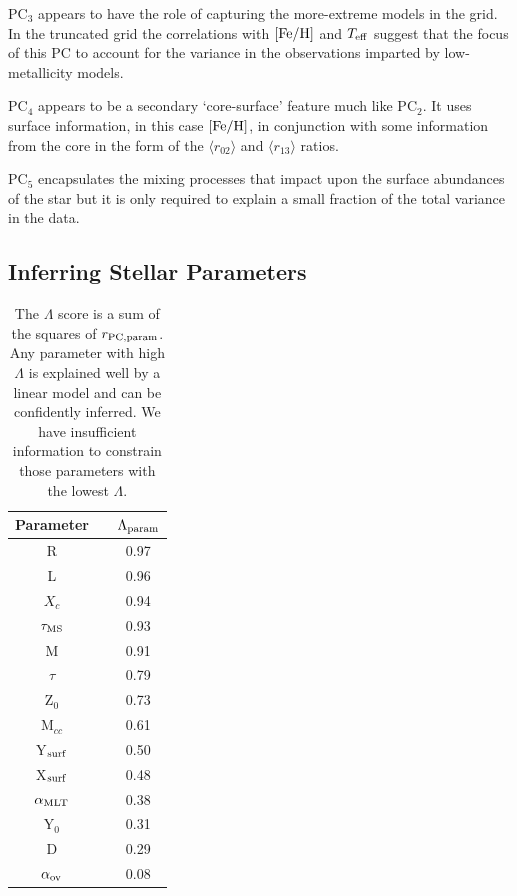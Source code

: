 PC$_3$ appears to have the role of capturing the more-extreme models in the grid. 
In the truncated grid the correlations with $[\rm{Fe/H}]$ and $T_{\rm{eff}}$ suggest that the focus of this PC to account for the variance in the observations imparted by low-metallicity models. 

PC$_4$ appears to be a secondary `core-surface' feature much like PC$_2$.  
It uses surface information, in this case $[\rm{Fe/H}]$, in conjunction with some information from the core in the form of the $\langle r_{02}\rangle$ and $\langle r_{13}\rangle$ ratios.  

PC$_5$ encapsulates the mixing processes that impact upon the surface abundances of the star but it is only required to explain a small fraction of the total variance in the data. 






\subsection{Inferring Stellar Parameters} 
\label{sec:ISP}

\begin{table}
    \centering
    \begin{tabular}{ccc}
    \hline \hline
   
Parameter &  & $\Lambda_{\rm{param}}$ \\ \hline     
R	&	&	0.97	\\
L	&	&	0.96	\\
$X_c$	&	&	0.94	\\
$\tau_{\rm{MS}}$	&	&	0.93	\\
M	&	&	0.91	\\
$\tau$	&	&	0.79	\\
Z$_0$	&	&	0.73	\\
M$_{cc}$	&	&	0.61	\\
Y$_{\rm{surf}}$	&	&	0.50	\\
X$_{\rm{surf}}$	&	&	0.48	\\
$\alpha_{\rm{MLT}}$	&	&	0.38	\\
Y$_0$	&	&	0.31	\\
D	&	&	0.29	\\
$\alpha_{\rm{ov}}$	&	&	0.08	\\
 \hline
    \end{tabular}
    \caption{The $\Lambda$ score is a sum of the squares of  $r_{\rm{PC, param}}$. Any parameter with high $\Lambda$ is explained well by a linear model and can be confidently inferred. We have insufficient information to constrain those parameters with the lowest $\Lambda$.}
    \label{tab:corrL}
\end{table}



